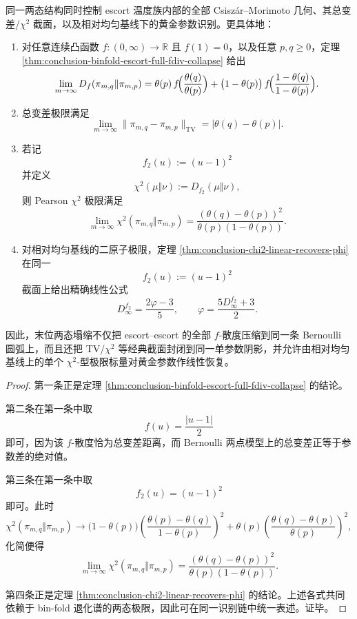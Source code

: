 \begin{proposition}\label{prop:conclusion-binfold-escort-csiszar-blackwell-phi}
同一两态结构同时控制 escort 温度族内部的全部 Csiszár--Morimoto 几何、其总变差/\(\chi^2\) 截面，以及相对均匀基线下的黄金参数识别。更具体地：
\begin{enumerate}
  \item 对任意连续凸函数 \(f:(0,\infty)\to\mathbb R\) 且 \(f(1)=0\)，以及任意 \(p,q\ge 0\)，定理 \ref{thm:conclusion-binfold-escort-full-fdiv-collapse} 给出
  \[
  \lim_{m\to\infty}D_f(\pi_{m,q}\Vert \pi_{m,p})
  =
  \theta(p)\,f\!\Bigl(\frac{\theta(q)}{\theta(p)}\Bigr)
  +
  \bigl(1-\theta(p)\bigr)\,
  f\!\Bigl(\frac{1-\theta(q)}{1-\theta(p)}\Bigr).
  \]
  \item 总变差极限满足
  \[
  \lim_{m\to\infty}\|\pi_{m,q}-\pi_{m,p}\|_{\mathrm{TV}}
  =
  |\theta(q)-\theta(p)|.
  \]
  \item 若记
  \[
  f_2(u):=(u-1)^2
  \]
  并定义
  \[
  \chi^2(\mu\Vert\nu):=D_{f_2}(\mu\Vert\nu),
  \]
  则 Pearson \(\chi^2\) 极限满足
  \[
  \lim_{m\to\infty}\chi^2(\pi_{m,q}\Vert \pi_{m,p})
  =
  \frac{(\theta(q)-\theta(p))^2}{\theta(p)(1-\theta(p))}.
  \]
  \item 对相对均匀基线的二原子极限，定理 \ref{thm:conclusion-chi2-linear-recovers-phi} 在同一
  \[
  f_2(u):=(u-1)^2
  \]
  截面上给出精确线性公式
  \[
  D_\infty^{f_2}=\frac{2\varphi-3}{5},
  \qquad
  \varphi=\frac{5D_\infty^{f_2}+3}{2}.
  \]
\end{enumerate}
因此，末位两态塌缩不仅把 escort--escort 的全部 \(f\)-散度压缩到同一条 Bernoulli 圆弧上，而且还把 TV/\(\chi^2\) 等经典截面封闭到同一单参数阴影，并允许由相对均匀基线上的单个 \(\chi^2\)-型极限标量对黄金参数作线性恢复。
\end{proposition}
\begin{proof}
第一条正是定理 \ref{thm:conclusion-binfold-escort-full-fdiv-collapse} 的结论。

第二条在第一条中取
\[
f(u)=\frac{|u-1|}{2}
\]
即可，因为该 \(f\)-散度恰为总变差距离，而 Bernoulli 两点模型上的总变差正等于参数差的绝对值。

第三条在第一条中取
\[
f_2(u)=(u-1)^2
\]
即可。此时
\[
\chi^2(\pi_{m,q}\Vert \pi_{m,p})
\longrightarrow
\bigl(1-\theta(p)\bigr)
\left(\frac{\theta(p)-\theta(q)}{1-\theta(p)}\right)^2
+\theta(p)
\left(\frac{\theta(q)-\theta(p)}{\theta(p)}\right)^2,
\]
化简便得
\[
\lim_{m\to\infty}\chi^2(\pi_{m,q}\Vert \pi_{m,p})
=
\frac{(\theta(q)-\theta(p))^2}{\theta(p)(1-\theta(p))}.
\]

第四条正是定理 \ref{thm:conclusion-chi2-linear-recovers-phi} 的结论。上述各式共同依赖于 bin-fold 退化谱的两态极限，因此可在同一识别链中统一表述。证毕。
\end{proof}

